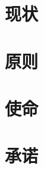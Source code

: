 \documentclass[a4paper,12pt]{ctexart}
\begin{document}
	\newpage
	\section{现状}
	
	
	\section{原则}
	\section{使命}
	\section{承诺}
\end{document}
